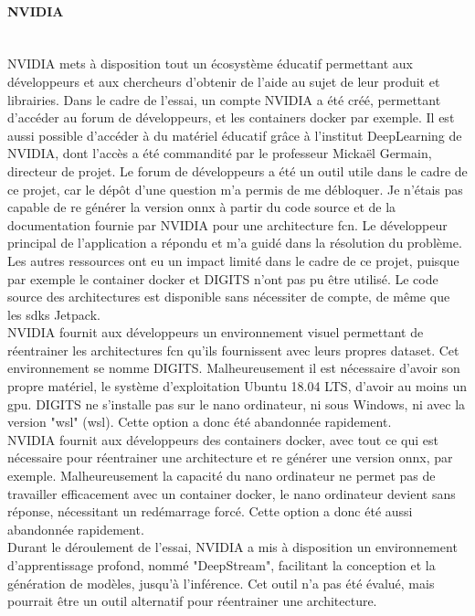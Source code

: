 \paragraph{NVIDIA}
\vspace{\baselineskip}
\\
\noindent NVIDIA mets à disposition tout un écosystème éducatif permettant aux développeurs et aux chercheurs d'obtenir de l'aide au sujet de leur produit et librairies. Dans le cadre de l'essai, un compte NVIDIA a été créé, permettant d'accéder au forum de développeurs, et les containers docker par exemple. Il est aussi possible d'accéder à du matériel éducatif grâce à l'institut DeepLearning de NVIDIA, dont l'accès a été commandité par le professeur Mickaël Germain, directeur de projet. Le forum de développeurs a été un outil utile dans le cadre de ce projet, car le dépôt d'une question m'a permis de me débloquer. Je n'étais pas capable de re générer la version \acrshort{onnx} à partir du code source et de la documentation fournie par NVIDIA pour une architecture \acrshort{fcn}. Le développeur principal de l'application a répondu et m'a guidé dans la résolution du problème. Les autres ressources ont eu un impact limité dans le cadre de ce projet, puisque par exemple le container docker et DIGITS n'ont pas pu être utilisé. Le code source des architectures est disponible sans nécessiter de compte, de même que les \acrshort{sdk}s Jetpack.
\vspace{\baselineskip}
\\
\noindent NVIDIA fournit aux développeurs un environnement visuel permettant de réentrainer les architectures \acrshort{fcn} qu'ils fournissent avec leurs propres dataset. Cet environnement se nomme DIGITS. Malheureusement il est nécessaire d'avoir son propre matériel, le système d'exploitation Ubuntu 18.04 LTS, d'avoir au moins un \acrshort{gpu}. DIGITS ne s'installe pas sur le nano ordinateur, ni sous Windows, ni avec la version "\acrshort{wsl}" (\acrlong{wsl}). Cette option a donc été abandonnée rapidement. 
\vspace{\baselineskip}
\\
\noindent NVIDIA fournit aux développeurs des containers docker, avec tout ce qui est nécessaire pour réentrainer une architecture et re générer une version \acrshort{onnx}, par exemple. Malheureusement la capacité du nano ordinateur ne permet pas de travailler efficacement avec un container docker, le nano ordinateur devient sans réponse, nécessitant un redémarrage forcé. Cette option a donc été aussi abandonnée rapidement. 
\vspace{\baselineskip}
\\
\noindent Durant le déroulement de l'essai, NVIDIA a mis à disposition un environnement d'apprentissage profond, nommé "DeepStream", facilitant la conception et la génération de modèles, jusqu'à l'inférence. Cet outil n'a pas été évalué, mais pourrait être un outil alternatif pour réentrainer une architecture.